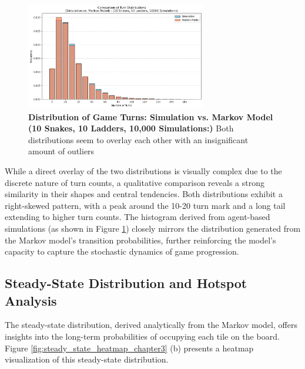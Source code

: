 \begin{figure}[th]
	\centering
	\includegraphics[width=0.7\textwidth]{"../Markov Modelling/Data/FrequencyOveralyed.png"}
	\caption{\textbf{Distribution of Game Turns: Simulation vs. Markov Model (10 Snakes, 10 Ladders, 10,000 Simulations:)} Both distributions seem to overlay each other with an insignificant amount of outliers}
	\label{fig:frequencydistributionMarkov}
\end{figure}

While a direct overlay of the two distributions is visually complex due to the discrete nature of turn counts, a qualitative comparison reveals a strong similarity in their shapes and central tendencies. Both distributions exhibit a right-skewed pattern, with a peak around the 10-20 turn mark and a long tail extending to higher turn counts. The histogram derived from agent-based simulations (as shown in Figure \ref{fig:frequencydistributionMarkov}) closely mirrors the distribution generated from the Markov model's transition probabilities, further reinforcing the model's capacity to capture the stochastic dynamics of game progression.

\subsection{Steady-State Distribution and Hotspot Analysis}

The steady-state distribution, derived analytically from the Markov model, offers insights into the long-term probabilities of occupying each tile on the board. Figure \ref{fig:steady_state_heatmap_chapter3} (b) presents a heatmap visualization of this steady-state distribution. 

